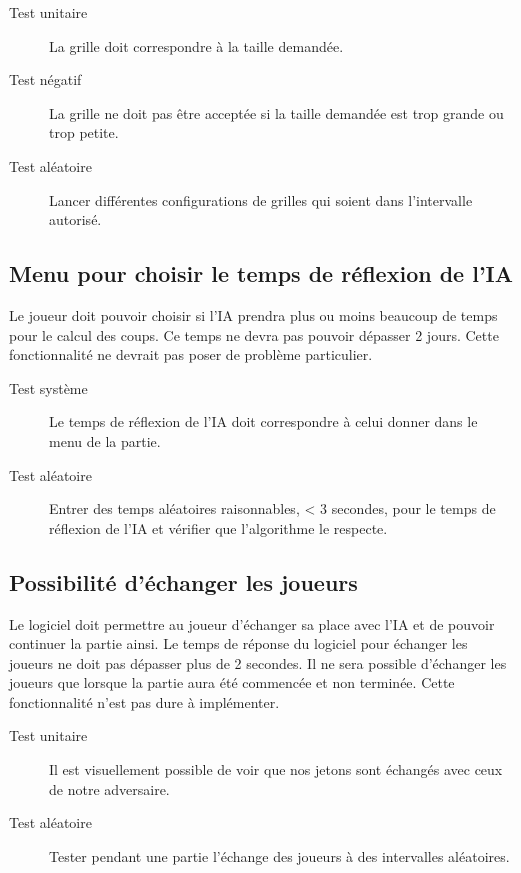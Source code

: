 \begin{description}
\item[Test unitaire] La grille doit correspondre à la taille demandée.
\item[Test négatif] La grille ne doit pas être acceptée si la taille demandée est trop grande ou trop petite.
\item[Test aléatoire] Lancer différentes configurations de grilles qui soient dans l’intervalle autorisé.
\end{description}

\subsection{Menu pour choisir le temps de réflexion de l’IA}

Le joueur doit pouvoir choisir si l’IA prendra plus ou moins beaucoup de temps pour le calcul des coups. Ce temps ne devra pas pouvoir dépasser 2 jours. Cette fonctionnalité ne devrait pas poser de problème particulier.

\begin{description}
\item[Test système] Le temps de réflexion de l’IA doit correspondre à celui donner dans le menu de la partie.
\item[Test aléatoire]  Entrer des temps aléatoires raisonnables, < 3 secondes, pour le temps de réflexion de l’IA et vérifier que l’algorithme le respecte.
\end{description}


\subsection{Possibilité d’échanger les joueurs}

Le logiciel doit permettre au joueur d’échanger sa place avec l’IA et de pouvoir continuer la partie ainsi. Le temps de réponse du logiciel pour échanger les joueurs ne doit pas dépasser plus de 2 secondes. Il ne sera possible d'échanger les joueurs que lorsque la partie aura été commencée et non terminée. Cette fonctionnalité n'est pas dure à implémenter.

\begin{description}
\item[Test unitaire] Il est visuellement possible de voir que nos jetons sont échangés avec ceux de notre adversaire.
\item[Test aléatoire] Tester pendant une partie l’échange des joueurs à des intervalles aléatoires.
\end{description}

